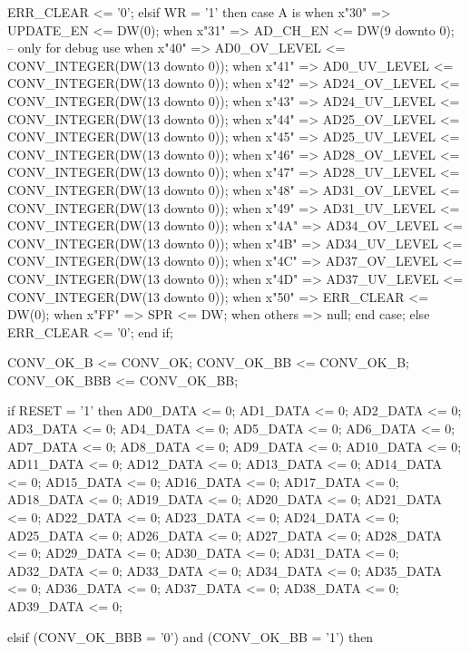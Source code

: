\begin{mylisting}[language=VHDL,caption=AD変換モジュール,label=appF_ADC_module_VHDL]
				ERR_CLEAR		<= '0';
			elsif WR = '1' then
				case A is
					when x"30"	=>	UPDATE_EN	<= DW(0);
					when x"31"	=>	AD_CH_EN	<= DW(9 downto 0);						-- only for debug use
					when x"40"	=>	AD0_OV_LEVEL	<= CONV_INTEGER(DW(13 downto 0));
					when x"41"	=>	AD0_UV_LEVEL	<= CONV_INTEGER(DW(13 downto 0));
					when x"42"	=>	AD24_OV_LEVEL	<= CONV_INTEGER(DW(13 downto 0));
					when x"43"	=>	AD24_UV_LEVEL	<= CONV_INTEGER(DW(13 downto 0));
					when x"44"	=>	AD25_OV_LEVEL	<= CONV_INTEGER(DW(13 downto 0));
					when x"45"	=>	AD25_UV_LEVEL	<= CONV_INTEGER(DW(13 downto 0));
					when x"46"	=>	AD28_OV_LEVEL	<= CONV_INTEGER(DW(13 downto 0));
					when x"47"	=>	AD28_UV_LEVEL	<= CONV_INTEGER(DW(13 downto 0));
					when x"48"	=>	AD31_OV_LEVEL	<= CONV_INTEGER(DW(13 downto 0));
					when x"49"	=>	AD31_UV_LEVEL	<= CONV_INTEGER(DW(13 downto 0));
					when x"4A"	=>	AD34_OV_LEVEL	<= CONV_INTEGER(DW(13 downto 0));
					when x"4B"	=>	AD34_UV_LEVEL	<= CONV_INTEGER(DW(13 downto 0));
					when x"4C"	=>	AD37_OV_LEVEL	<= CONV_INTEGER(DW(13 downto 0));
					when x"4D"	=>	AD37_UV_LEVEL	<= CONV_INTEGER(DW(13 downto 0));
					when x"50"	=>	ERR_CLEAR	<= DW(0);
					when x"FF"	=>	SPR			<= DW;
					when others		=> null;
				end case;
			else
				ERR_CLEAR		<= '0';
			end if;
			
			
			CONV_OK_B	<= CONV_OK;
			CONV_OK_BB	<= CONV_OK_B;
			CONV_OK_BBB	<= CONV_OK_BB;
			
			
			if RESET = '1' then
				AD0_DATA	<= 0;
				AD1_DATA	<= 0;
				AD2_DATA	<= 0;
				AD3_DATA	<= 0;
				AD4_DATA	<= 0;
				AD5_DATA	<= 0;
				AD6_DATA	<= 0;
				AD7_DATA	<= 0;
				AD8_DATA	<= 0;
				AD9_DATA	<= 0;
				AD10_DATA	<= 0;
				AD11_DATA	<= 0;
				AD12_DATA	<= 0;
				AD13_DATA	<= 0;
				AD14_DATA	<= 0;
				AD15_DATA	<= 0;
				AD16_DATA	<= 0;
				AD17_DATA	<= 0;
				AD18_DATA	<= 0;
				AD19_DATA	<= 0;
				AD20_DATA	<= 0;
				AD21_DATA	<= 0;
				AD22_DATA	<= 0;
				AD23_DATA	<= 0;
				AD24_DATA	<= 0;
				AD25_DATA	<= 0;
				AD26_DATA	<= 0;
				AD27_DATA	<= 0;
				AD28_DATA	<= 0;
				AD29_DATA	<= 0;
				AD30_DATA	<= 0;
				AD31_DATA	<= 0;
				AD32_DATA	<= 0;
				AD33_DATA	<= 0;
				AD34_DATA	<= 0;
				AD35_DATA	<= 0;
				AD36_DATA	<= 0;
				AD37_DATA	<= 0;
				AD38_DATA	<= 0;
				AD39_DATA	<= 0;
				
			elsif (CONV_OK_BBB = '0') and (CONV_OK_BB = '1') then
				

\end{mylisting}
